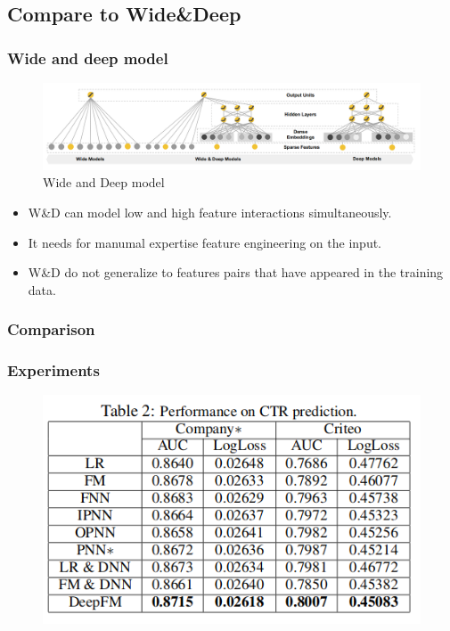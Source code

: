 \documentclass{beamer}
\begin{document}
\subsection{Compare to Wide\&Deep}
\begin{frame}
	\frametitle{Wide and deep model}
	\begin{figure}
		\includegraphics[scale=0.22]{wnd}
		\caption{Wide and Deep model}
	\end{figure}
	
	\begin{itemize}
		\item W\&D can model low and high feature interactions simultaneously. 
		\item It needs for manumal expertise feature engineering on the input. 
		\item W\&D do not generalize to features pairs that have appeared in the training data. 
	\end{itemize}
\end{frame}

\begin{frame}
	\frametitle{Comparison}
\end{frame}

\begin{frame}
	\frametitle{Experiments}
	\begin{figure}
		\includegraphics[scale=0.5]{experiment}
	\end{figure}
\end{frame}
\end{document}
